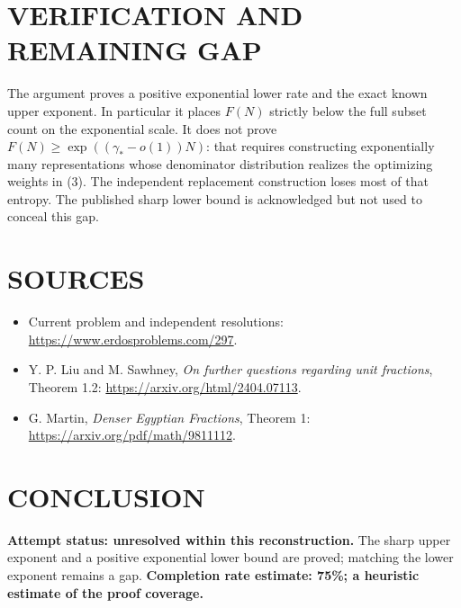 \section{VERIFICATION AND REMAINING GAP}
The argument proves a positive exponential lower rate and the exact known upper exponent. In particular it places $F(N)$ strictly below the full subset count on the exponential scale. It does not prove $F(N)\geq\exp((\gamma_*-o(1))N)$: that requires constructing exponentially many representations whose denominator distribution realizes the optimizing weights in (3). The independent replacement construction loses most of that entropy. The published sharp lower bound is acknowledged but not used to conceal this gap.

\section{SOURCES}
\begin{itemize}
\item Current problem and independent resolutions: \url{https://www.erdosproblems.com/297}.
\item Y. P. Liu and M. Sawhney, \emph{On further questions regarding unit fractions}, Theorem 1.2: \url{https://arxiv.org/html/2404.07113}.
\item G. Martin, \emph{Denser Egyptian Fractions}, Theorem 1: \url{https://arxiv.org/pdf/math/9811112}.
\end{itemize}
\section{CONCLUSION}
\textbf{Attempt status: unresolved within this reconstruction.}
The sharp upper exponent and a positive exponential lower bound are proved; matching the lower exponent remains a gap.
\textbf{Completion rate estimate: 75\%; a heuristic estimate of the proof coverage.}

